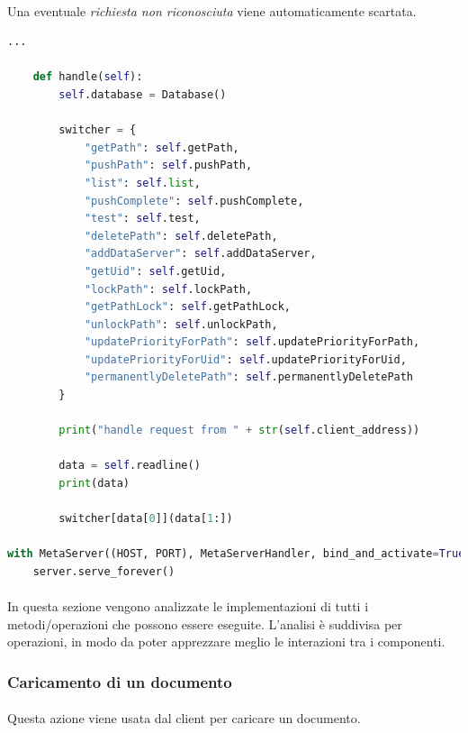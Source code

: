 \documentclass[11pt,a4paper,english]{article}
\begin{document}
\paragraph{} Una eventuale \emph{richiesta non riconosciuta} viene automaticamente scartata.

\begin{lstlisting}[language=Python, title=Metaserver e relativo handler]
    ...
    
    def handle(self):
        self.database = Database()

        switcher = {
            "getPath": self.getPath,
            "pushPath": self.pushPath,
            "list": self.list,
            "pushComplete": self.pushComplete,
            "test": self.test,
            "deletePath": self.deletePath,
            "addDataServer": self.addDataServer,
            "getUid": self.getUid,
            "lockPath": self.lockPath,
            "getPathLock": self.getPathLock,
            "unlockPath": self.unlockPath,
            "updatePriorityForPath": self.updatePriorityForPath,
            "updatePriorityForUid": self.updatePriorityForUid,
            "permanentlyDeletePath": self.permanentlyDeletePath
        }

        print("handle request from " + str(self.client_address))

        data = self.readline()
        print(data)

        switcher[data[0]](data[1:])

with MetaServer((HOST, PORT), MetaServerHandler, bind_and_activate=True) as server:
    server.serve_forever()
\end{lstlisting}

\paragraph{} In questa sezione vengono analizzate le implementazioni di tutti i metodi/operazioni che possono essere eseguite. L'analisi è suddivisa per operazioni, in modo da poter apprezzare meglio le interazioni tra i componenti. 

\subsubsection{Caricamento di un documento}

\paragraph{} Questa azione viene usata dal client per caricare un documento.
\end{document}

